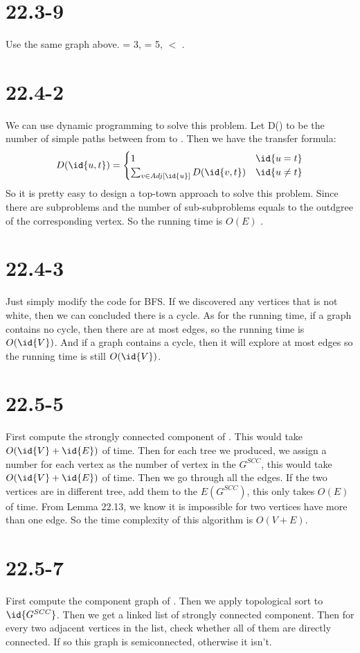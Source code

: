 \documentclass[a4paper]{article}
\begin{document}
 \section*{22.3-9}
 Use the same graph above.  = 3,  = 5,
   $<$ .

\section*{22.4-2}
We can use dynamic programming to solve this problem. Let
D() to be the number of simple paths between from
 to . Then we have the transfer formula:\\
$$D(\id{u,t}) =
\begin{cases}
1& \id{u = t} \\
\sum_{v\in Adj[\id{u}]} D(\id{v,t})& \id{u \not= t}

\end{cases}$$
So it is pretty easy to design a top-town approach to solve
this problem. Since there are  subproblems and the number
of sub-subproblems equals to the outdgree of the corresponding
vertex. So the running time is $O(E)$ .
\section*{22.4-3}
Just simply modify the code for BFS. If we discovered any vertices that
is not white, then we can concluded there is a cycle. As for the
running time, if a graph contains no cycle, then there are at most
 edges, so the running time is $O(\id{V})$. And if a graph
contains a cycle, then it will explore at most  edges so the
running time is still $O(\id{V})$.
\section*{22.5-5}
First compute the strongly connected component of . This would
take $O(\id{V}+\id{E})$ of time. Then for each tree we produced, we assign
a number for each vertex as the number of vertex in the $G^{SCC}$, this would take $O(\id{V}+\id{E})$ of time. Then we
go through all the edges. If the two vertices are in different tree, add them to
the $E(G^{SCC})$, this only takes $O(E)$ of time. From Lemma 22.13, we know it is impossible for two vertices have more than one edge.
So the time complexity of this algorithm is $O(V+E)$.
\section*{22.5-7}
First compute the component graph of . Then we apply topological sort to $\id{G^{SCC}}$.
Then we get a linked list of strongly connected component. Then for every two adjacent vertices in the list,
check whether all of them are directly connected. If so this graph is semiconnected, otherwise it isn't.
\end{document}
